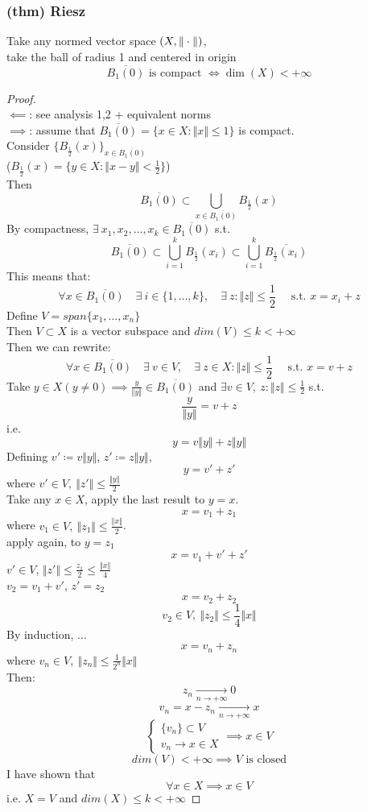 \subsubsection{(thm) Riesz}
Take any normed vector space $(X,\Vert \cdot \Vert)$, \\
take the ball of radius 1 and centered in origin $$\overline{B_1(0)}\text{ is compact }\iff \dim(X)<+\infty$$
\begin{proof}\ \\
$\impliedby$: see analysis 1,2 + equivalent norms\\
$\implies$: assume that $\overline{B_1(0)}=\{ x\in X: \Vert x\Vert \leq 1\}$ is compact.\\
Consider $\{B_{\frac 12}(x)\}_{x\in \overline{B_1(0)}}$\\
($B_{\frac 12}(x)=\{y\in X:\Vert x-y\Vert <\frac 12\}$)\\
Then $$\overline{B_1(0)}\subset \bigcup_{x\in \overline{B_1(0)}}B_{\frac 12}(x)$$
By compactness, $\exists\ x_1,x_2,\dots,x_k\in \overline{B_1(0)}$ s.t.
$$\overline{B_1(0)}\subset \bigcup_{i=1}^kB_{\frac 12}(x_i)\subset \bigcup_{i=1}^k\overline{B_{\frac 12}(x_i)}$$
This means that:
    $$\forall x\in \overline{B_1(0)}\quad \exists\ i\in \{1,\dots,k\},\quad \exists \ z:\Vert z\Vert \leq \frac 12\quad \text{ s.t. }x=x_i+z$$
Define $V=span\{x_1,\dots,x_n\}$ \\
Then $V\subset X$ is a vector subspace and $dim(V)\leq k<+\infty$\\
Then we can rewrite:
$$\forall x\in \overline{B_1(0)}\quad \exists\ v\in V,\quad \exists \ z\in X:\Vert z\Vert \leq \frac 12\quad \text{ s.t. }x=v+z$$
Take $y\in X(y\neq0)\implies \frac{y}{\Vert y\Vert}\in \overline{B_1(0)}$ and $\exists v\in V, \ z:\Vert z\Vert \leq \frac 12$ s.t. 
$$\frac y{\Vert y\Vert}=v+z$$
i.e.
$$y=v\Vert y\Vert+z\Vert y\Vert $$
Defining $v'\coloneqq v\Vert y\Vert$, $z'\coloneqq z\Vert y\Vert$,
$$y=v'+z'$$
where $v'\in V, \ \Vert z'\Vert \leq \frac{\Vert y\Vert}{2}$\\
Take any $x\in X$, apply the last result to $y=x$.
$$x=v_1+z_1$$
where $v_1\in V, \ \Vert z_1\Vert \leq \frac{\Vert x\Vert}2$.\\
apply again, to $y=z_1$\\
$$x=v_1+v'+z'$$
$v'\in V$, $\Vert z'\Vert \leq \frac{z_1}2\leq \frac{\Vert x\Vert}4$\\
$v_2 = v_1+v'$, $z'=z_2$\\
$$x =v_2+z_2$$
$$v_2\in V, \ \Vert z_2\Vert \leq \frac 14 \Vert x\Vert$$
By induction, ...
$$x=v_n+z_n$$
where $v_n\in V, \ \Vert z_n\Vert \leq \frac 1{2^n}\Vert x\Vert$\\
Then:
$$z_n\xrightarrow[n\to+\infty]{}0$$
$$v_n=x-z_n\xrightarrow[n\to+\infty]{}x$$
$$\begin{cases}
    \{v_n\}\subset V\\v_n\to x\in X
\end{cases}\implies x\in V$$
$$dim(V)<+\infty\implies V\text{ is closed}$$
I have shown that $$\forall x\in X\implies x\in V$$
i.e. $X=V$ and $dim (X)\leq k<+\infty$
\end{proof}

